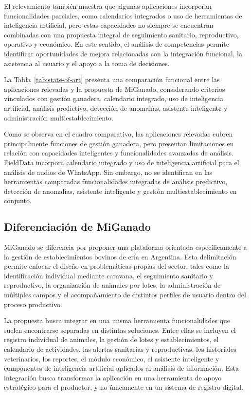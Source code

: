 El relevamiento tambi\'en muestra que algunas aplicaciones incorporan funcionalidades parciales, como calendarios integrados o uso de herramientas de inteligencia artificial, pero estas capacidades no siempre se encuentran combinadas con una propuesta integral de seguimiento sanitario, reproductivo, operativo y econ\'omico. En este sentido, el an\'alisis de competencias permite identificar oportunidades de mejora relacionadas con la integraci\'on funcional, la asistencia al usuario y el apoyo a la toma de decisiones.

La Tabla~\ref{tab:state-of-art} presenta una comparaci\'on funcional entre las aplicaciones relevadas y la propuesta de MiGanado, considerando criterios vinculados con gesti\'on ganadera, calendario integrado, uso de inteligencia artificial, an\'alisis predictivo, detecci\'on de anomal\'ias, asistente inteligente y administraci\'on multiestablecimiento.

Como se observa en el cuadro comparativo, las aplicaciones relevadas cubren principalmente funciones de gesti\'on ganadera, pero presentan limitaciones en relaci\'on con capacidades inteligentes y funcionalidades avanzadas de an\'alisis. FieldData incorpora calendario integrado y uso de inteligencia artificial para el an\'alisis de audios de WhatsApp. Sin embargo, no se identifican en las herramientas comparadas funcionalidades integradas de an\'alisis predictivo, detecci\'on de anomal\'ias, asistente inteligente y gesti\'on multiestablecimiento en conjunto.

\subsection{Diferenciaci\'on de MiGanado}

MiGanado se diferencia por proponer una plataforma orientada espec\'ificamente a la gesti\'on de establecimientos bovinos de cr\'ia en Argentina. Esta delimitaci\'on permite enfocar el dise\~no en problem\'aticas propias del sector, tales como la identificaci\'on individual mediante caravana, el seguimiento sanitario y reproductivo, la organizaci\'on de animales por lotes, la administraci\'on de m\'ultiples campos y el acompa\~namiento de distintos perfiles de usuario dentro del proceso productivo.

La propuesta busca integrar en una misma herramienta funcionalidades que suelen encontrarse separadas en distintas soluciones. Entre ellas se incluyen el registro individual de animales, la gesti\'on de lotes y establecimientos, el calendario de actividades, las alertas sanitarias y reproductivas, los historiales veterinarios, los reportes, el m\'odulo econ\'omico, el asistente inteligente y componentes de inteligencia artificial aplicados al an\'alisis de informaci\'on. Esta integraci\'on busca transformar la aplicaci\'on en una herramienta de apoyo estrat\'egico para el productor, y no \'unicamente en un sistema de registro digital.

